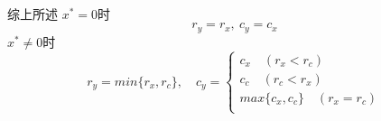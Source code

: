\documentclass{article}
\begin{document}
\begin{CJK}{UTF8}{gbsn}
  \paragraph{}
  综上所述
  $x^* = 0$时
  \begin{equation}
    r_y = r_x,\ c_y = c_x
  \end{equation}
  $x^* \not= 0$时
  \begin{equation}
    r_y = min\{r_x, r_c\}, \quad
    c_y =
    \begin{cases}
      c_x \quad (r_x < r_c) \\
      c_c \quad (r_c < r_x) \\
      max\{c_x, c_c\} \quad (r_x = r_c) \\
    \end{cases}
  \end{equation}
\end{CJK}
\end{document}
